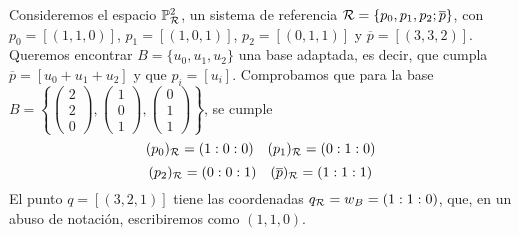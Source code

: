
\begin{example}
    Consideremos el espacio $\mathbb{P}^2_{\mathcal{R}}$, un sistema de referencia $\mathcal{R} = \{ p_0, p_1, p_2; \overline{p}\}$, con 
    $p_0 = [(1, 1, 0)]$, $p_1 = [(1, 0, 1)]$, $p_2 = [(0, 1, 1)]$ y $\overline{p} = [(3,3,2)]$.
    Queremos encontrar $B = \{u_0, u_1, u_2\}$ una base adaptada, es decir, que cumpla $\overline{p} = [u_0+u_1+u_2]$
    y que $p_i = [u_i]$. Comprobamos que para la base $B = \left \{ \begin{pmatrix} 2 \\ 2 \\ 0 \end{pmatrix},
    \begin{pmatrix} 1 \\ 0 \\ 1 \end{pmatrix}, \begin{pmatrix} 0 \\ 1 \\ 1 \end{pmatrix} \right \}$, se cumple
    \[(p_0)_{\mathcal{R}} = (1:0:0) \quad (p_1)_{\mathcal{R}} = (0:1:0)\]
    \[(p_2)_{\mathcal{R}} = (0:0:1) \quad (\overline{p})_{\mathcal{R}} = (1:1:1)\]
    El punto $q = [(3, 2, 1)]$ tiene las coordenadas $q_{\mathcal{R}} = w_B = (1:1:0)$, que, en un abuso de notación,
    escribiremos como $(1, 1, 0)$.
\end{example}

